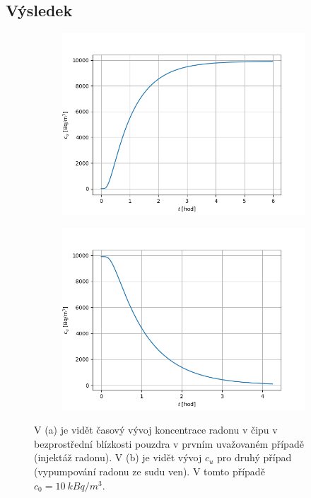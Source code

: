 \documentclass[11pt,a4paper]{article}
\begin{document}
\subsection{Výsledek}
\begin{figure}[t!]
	\centering
	\begin{subfigure}{.7\textwidth}
		\includegraphics[width=\linewidth]{narust}
		\caption{}
		\label{fig:narust}
	\end{subfigure}
	\begin{subfigure}{.7\textwidth}
		\includegraphics[width=\linewidth]{pokles}
		\caption{}
		\label{fig:pokles}
	\end{subfigure}
\caption{V (a) je vidět časový vývoj koncentrace radonu v čipu v bezprostřední blízkosti pouzdra v prvním uvažovaném případě (injektáž radonu). V (b) je vidět vývoj $c_u$ pro druhý případ (vypumpování radonu ze sudu ven). V tomto případě $c_0=\SI{10}{kBq/m^3}$.}
\label{fig:vyvoj_uvnitr}
\end{figure}
\end{document}
